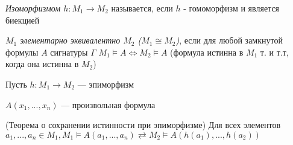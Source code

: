 \documentclass{article}
\begin{document}
\begin{definition}
	\textit{Изоморфизмом $h: M_1 \rightarrow M_2$} называется, если $h$ - гомоморфизм и является биекцией
\end{definition}

\begin{definition}
	\textit{$M_1$ элементарно эквивалентно $M_2$ ($M_1 \cong M_2$)}, если для любой замкнутой формулы $A$ сигнатуры $\Gamma$ $M_1 \vDash A \Leftrightarrow M_2 \vDash A$ (формула истинна в $M_1$ т. и т.т, когда она истинна в $M_2$)
\end{definition}

Пусть $h: M_1 \rightarrow M_2$ --- эпиморфизм

$A(x_1,..., x_n)$ --- произвольная формула
\begin{theorem}{(Теорема о сохранении истинности при эпиморфизме)}
	Для всех элементов $a_1,..., a_n \in M_1, M_1 \vDash A(a_1,..., a_n) \rightleftarrow M_2 \vDash A(h(a_1),..., h(a_2))$ 
\end{theorem}
\end{document}
